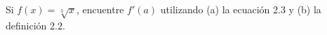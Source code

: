 \item Si $f(x) = \sqrt[3]{x}$, encuentre $f'(a)$ utilizando (a) la ecuación 2.3 y (b) la definición 2.2.
